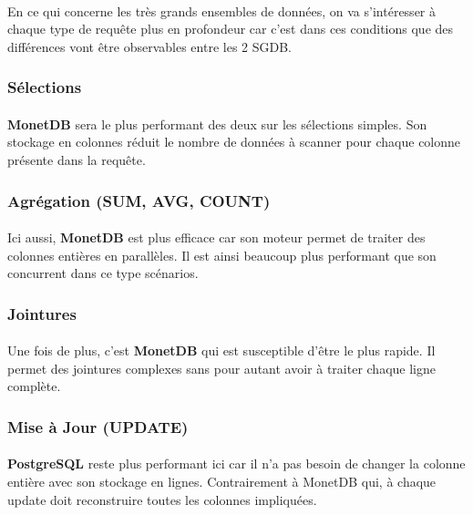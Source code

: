 \documentclass[11pt]{extarticle}
\begin{document}
\paragraph{}
En ce qui concerne les très grands ensembles de données, on va s'intéresser à chaque type de requête plus en profondeur car c'est dans ces conditions que des différences vont être observables entre les 2 SGDB.

\subsubsection{Sélections}
\paragraph{}
\textbf{MonetDB} sera le plus performant des deux sur les sélections simples. Son stockage en colonnes réduit le nombre de données à scanner pour chaque colonne présente dans la requête.

\subsubsection{Agrégation (SUM, AVG, COUNT)}
\paragraph{}
Ici aussi, \textbf{MonetDB} est plus efficace car son moteur permet de traiter des colonnes entières en parallèles. Il est ainsi beaucoup plus performant que son concurrent dans ce type scénarios.

\subsubsection{Jointures}
\paragraph{}
Une fois de plus, c'est \textbf{MonetDB} qui est susceptible d'être le plus rapide. Il permet des jointures complexes sans pour autant avoir à traiter chaque ligne complète.

\subsubsection{Mise à Jour (UPDATE)}
\paragraph{}
\textbf{PostgreSQL} reste plus performant ici car il n'a pas besoin de changer la colonne entière avec son stockage en lignes. Contrairement à MonetDB qui, à chaque update doit reconstruire toutes les colonnes impliquées.
\end{document}
